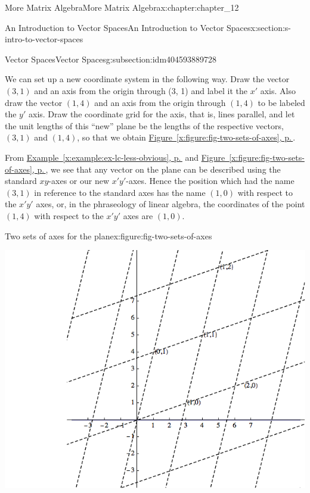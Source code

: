 \documentclass[twoside,10pt,]{book}
\newcommand{\xreffont}{\relax}
\numberwithin{equation}{section}
\begin{document}
\begin{chapterptx}{More Matrix Algebra}{}{More Matrix Algebra}{}{}{x:chapter:chapter_12}
\begin{sectionptx}{An Introduction to Vector Spaces}{}{An Introduction to Vector Spaces}{}{}{x:section:s-intro-to-vector-spaces}
\begin{subsectionptx}{Vector Spaces}{}{Vector Spaces}{}{}{g:subsection:idm404593889728}
\par
We can set up a new coordinate system in the following way.  Draw the vector \((3, 1)\) and an axis from the origin through (3, 1) and label it the \(x'\) axis. Also draw the vector \((1,4)\) and an axis from the origin through \((1,4)\) to be labeled the \(y'\) axis. Draw the coordinate grid for the axis, that is, lines parallel, and let the unit lengths of this ``new'' plane be the lengths of the respective vectors, \((3, 1)\) and \((1, 4)\), so that we obtain \hyperref[x:figure:fig-two-sets-of-axes]{Figure~{\xreffont\ref{x:figure:fig-two-sets-of-axes}}, p.\,\pageref{x:figure:fig-two-sets-of-axes}}.%
\par
From \hyperref[x:example:ex-lc-less-obvious]{Example~{\xreffont\ref{x:example:ex-lc-less-obvious}}, p.\,\pageref{x:example:ex-lc-less-obvious}}  and \hyperref[x:figure:fig-two-sets-of-axes]{Figure~{\xreffont\ref{x:figure:fig-two-sets-of-axes}}, p.\,\pageref{x:figure:fig-two-sets-of-axes}}, we see that any vector on the plane can be described using the standard \(xy\)-axes or our new \(x'y'\)-axes. Hence the position which had the name \((3,1)\) in reference to the standard axes has the name \((1,0)\) with respect to the \(x'y'\) axes, or, in the phraseology of linear algebra, the coordinates of the point \((1,4)\) with respect to the \(x'y'\) axes are \((1, 0)\).%
\begin{figureptx}{Two sets of axes for the plane}{x:figure:fig-two-sets-of-axes}{}%
\begin{image}{0.15}{0.7}{0.15}%
\includegraphics[width=\linewidth]{images/fig-two-sets-of-axes.png}

\end{image}
\end{figureptx}
\end{subsectionptx}
\end{sectionptx}
\end{chapterptx}
\end{document}
